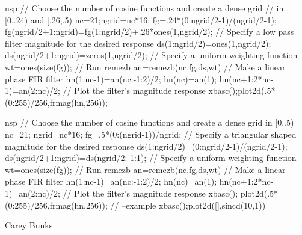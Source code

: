 \begin{examples}
  \begin{mintednsp}{nsp}
    // Choose the number of cosine functions and create a dense grid 
    // in [0,.24) and [.26,.5)
    nc=21;ngrid=nc*16;
    fg=.24*(0:ngrid/2-1)/(ngrid/2-1);
    fg(ngrid/2+1:ngrid)=fg(1:ngrid/2)+.26*ones(1,ngrid/2);
    // Specify a low pass filter magnitude for the desired response
    ds(1:ngrid/2)=ones(1,ngrid/2);
    ds(ngrid/2+1:ngrid)=zeros(1,ngrid/2);
    // Specify a uniform weighting function
    wt=ones(size(fg));
    // Run remezb
    an=remezb(nc,fg,ds,wt)
    // Make a linear phase FIR filter 
    hn(1:nc-1)=an(nc:-1:2)/2;
    hn(nc)=an(1);
    hn(nc+1:2*nc-1)=an(2:nc)/2;
    // Plot the filter's magnitude response
    xbasc();plot2d(.5*(0:255)/256,frmag(hn,256));
  \end{mintednsp}

  \begin{mintednsp}{nsp}
    // Choose the number of cosine functions and create a dense grid in [0,.5)
    nc=21; ngrid=nc*16;
    fg=.5*(0:(ngrid-1))/ngrid;
    // Specify a triangular shaped magnitude for the desired response
    ds(1:ngrid/2)=(0:ngrid/2-1)/(ngrid/2-1);
    ds(ngrid/2+1:ngrid)=ds(ngrid/2:-1:1);
    // Specify a uniform weighting function
    wt=ones(size(fg));
    // Run remezb
    an=remezb(nc,fg,ds,wt)
    // Make a linear phase FIR filter 
    hn(1:nc-1)=an(nc:-1:2)/2;
    hn(nc)=an(1);
    hn(nc+1:2*nc-1)=an(2:nc)/2;
    // Plot the filter's magnitude response
    xbasc();   plot2d(.5*(0:255)/256,frmag(hn,256));
    // --example 
    xbasc();plot2d([],sincd(10,1)) 
  \end{mintednsp}
\end{examples}
\begin{manseealso}
\end{manseealso}
\begin{authors}
  Carey Bunks
\end{authors}
